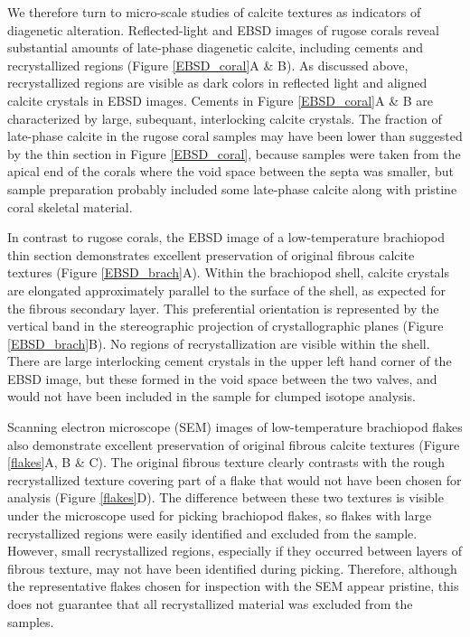 \documentclass{article}
\begin{document}
We therefore turn to micro-scale studies of calcite textures as indicators of diagenetic alteration. Reflected-light and EBSD images of rugose corals reveal substantial amounts of late-phase diagenetic calcite, including cements and recrystallized regions (Figure \ref{EBSD_coral}A \& B). As discussed above, recrystallized regions are visible as dark colors in reflected light and aligned calcite crystals in EBSD images. Cements in Figure \ref{EBSD_coral}A \& B are characterized by large, subequant, interlocking calcite crystals. The fraction of late-phase calcite in the rugose coral samples may have been lower than suggested by the thin section in Figure \ref{EBSD_coral}, because samples were taken from the apical end of the corals where the void space between the septa was smaller, but sample preparation probably included some late-phase calcite along with pristine coral skeletal material. 

In contrast to rugose corals, the EBSD image of a low-temperature brachiopod thin section demonstrates excellent preservation of original fibrous calcite textures (Figure \ref{EBSD_brach}A). Within the brachiopod shell, calcite crystals are elongated approximately parallel to the surface of the shell, as expected for the fibrous secondary layer. This preferential orientation is represented by the vertical band in the stereographic projection of crystallographic planes (Figure \ref{EBSD_brach}B). No regions of recrystallization are visible within the shell. There are large interlocking cement crystals in the upper left hand corner of the EBSD image, but these formed in the void space between the two valves, and would not have been included in the sample for clumped isotope analysis. 

Scanning electron microscope (SEM) images of low-temperature brachiopod flakes also demonstrate excellent preservation of original fibrous calcite textures (Figure \ref{flakes}A, B \& C). The original fibrous texture clearly contrasts with the rough recrystallized texture covering part of a flake that would not have been chosen for analysis (Figure \ref{flakes}D). The difference between these two textures is visible under the microscope used for picking brachiopod flakes, so flakes with large recrystallized regions were easily identified and excluded from the sample. However, small recrystallized regions, especially if they occurred between layers of fibrous texture, may not have been identified during picking. Therefore, although the representative flakes chosen for inspection with the SEM appear pristine, this does not guarantee that all recrystallized material was excluded from the samples.
\end{document}

